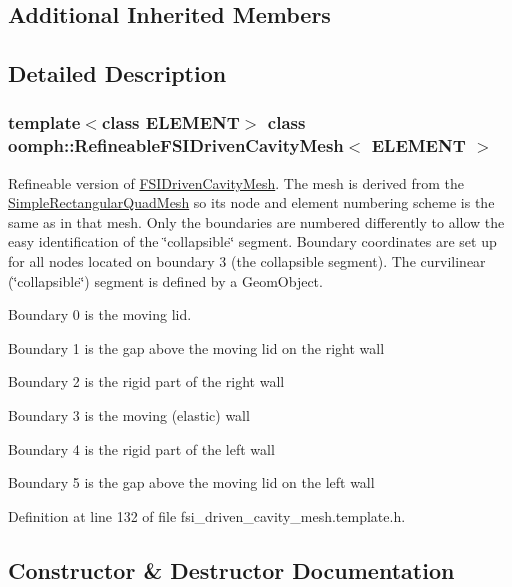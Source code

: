 \subsection*{Additional Inherited Members}


\subsection{Detailed Description}
\subsubsection*{template$<$class E\+L\+E\+M\+E\+NT$>$\newline
class oomph\+::\+Refineable\+F\+S\+I\+Driven\+Cavity\+Mesh$<$ E\+L\+E\+M\+E\+N\+T $>$}

Refineable version of \hyperlink{classoomph_1_1FSIDrivenCavityMesh}{F\+S\+I\+Driven\+Cavity\+Mesh}. The mesh is derived from the {\ttfamily \hyperlink{classoomph_1_1SimpleRectangularQuadMesh}{Simple\+Rectangular\+Quad\+Mesh}} so it\textquotesingle{}s node and element numbering scheme is the same as in that mesh. Only the boundaries are numbered differently to allow the easy identification of the \char`\"{}collapsible\char`\"{} segment. Boundary coordinates are set up for all nodes located on boundary 3 (the collapsible segment). The curvilinear (\char`\"{}collapsible\char`\"{}) segment is defined by a {\ttfamily Geom\+Object}.
\begin{DoxyItemize}
\item Boundary 0 is the moving lid.
\item Boundary 1 is the gap above the moving lid on the right wall
\item Boundary 2 is the rigid part of the right wall
\item Boundary 3 is the moving (elastic) wall
\item Boundary 4 is the rigid part of the left wall
\item Boundary 5 is the gap above the moving lid on the left wall 
\end{DoxyItemize}

Definition at line 132 of file fsi\+\_\+driven\+\_\+cavity\+\_\+mesh.\+template.\+h.



\subsection{Constructor \& Destructor Documentation}
\mbox{\label{classoomph_1_1RefineableFSIDrivenCavityMesh_a91c0ab00784098cb0e583ab0882b0e0e}} 
